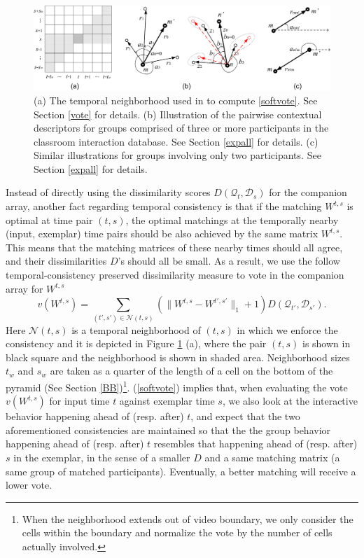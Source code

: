 \begin{figure}[t]
\begin{center}
\includegraphics[scale=1.2]{all_illu.png}
\end{center}
\caption{(a) The temporal neighborhood used in to compute \ref{softvote}. See Section \ref{vote} for details. (b) Illustration of the pairwise contextual descriptors for groups comprised of three or more participants in the classroom interaction database. See Section \ref{expall} for details. (c) Similar illustrations for groups involving only two participants. See Section \ref{expall} for details.}
\label{all_illu}
\end{figure}

Instead of directly using the dissimilarity scores $D(\mathcal{Q}_{t}, \mathcal{D}_{s})$ for the companion array, another fact regarding temporal consistency is that if the matching $W^{t,s}$ is optimal at time pair $(t,s)$, the optimal matchings at the temporally nearby (input, exemplar) time pairs should be also achieved by the same matrix $W^{t,s}$. This means that the matching matrices of these nearby times should all agree, and their dissimilarities $D$'s should all be small.  As a result, we use the follow temporal-consistency preserved dissimilarity measure to vote in the companion array for $W^{t,s}$
\begin{equation}
\label{softvote}
v(W^{t,s})=\sum_{(t',s')\in\mathcal{N}(t,s)}(\|W^{t,s}-W^{t',s'}\|_{1}+1)D(\mathcal{Q}_{t'}, \mathcal{D}_{s'}).
\end{equation}
Here $\mathcal{N}(t,s)$ is a temporal neighborhood of $(t,s)$ in which we enforce the consistency and it is depicted in Figure \ref{all_illu} (a), where the pair $(t,s)$ is shown in black square and the neighborhood is shown in shaded area. Neighborhood sizes $t_{w}$ and $s_{w}$ are taken as a quarter of the length of a cell on the bottom of the pyramid (See Section \ref{BB})\footnote{When the neighborhood extends out of video boundary, we only consider the cells within the boundary and normalize the vote by the number of cells actually involved.}. (\ref{softvote}) implies that, when evaluating the vote $v(W^{t,s})$ for input time $t$ against exemplar time $s$, we also look at the interactive behavior happening ahead of (resp. after) $t$, and expect that the two aforementioned consistencies are maintained so that the the group behavior happening ahead of (resp. after) $t$ resembles that happening ahead of (resp. after) $s$ in the exemplar, in the sense of a smaller $D$ and a same matching matrix (a same group of matched participants). Eventually, a better matching will receive a lower vote. 

